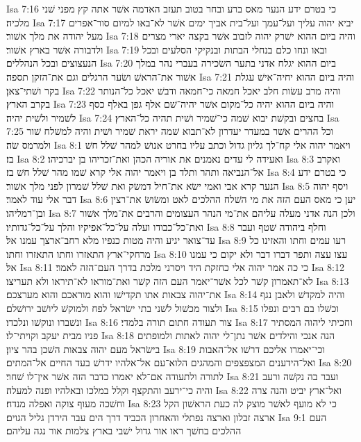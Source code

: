 Isa 7:16  כי בטרם ידע הנער מאס ברע ובחר בטוב תעזב האדמה אשׁר אתה קץ מפני שׁני מלכיה׃
Isa 7:17  יביא יהוה עליך ועל־עמך ועל־בית אביך ימים אשׁר לא־באו למיום סור־אפרים מעל יהודה את מלך אשׁור׃
Isa 7:18  והיה ביום ההוא ישׁרק יהוה לזבוב אשׁר בקצה יארי מצרים ולדבורה אשׁר בארץ אשׁור׃
Isa 7:19  ובאו ונחו כלם בנחלי הבתות ובנקיקי הסלעים ובכל הנעצוצים ובכל הנהללים׃
Isa 7:20  ביום ההוא יגלח אדני בתער השׂכירה בעברי נהר במלך אשׁור את־הראשׁ ושׂער הרגלים וגם את־הזקן תספה׃
Isa 7:21  והיה ביום ההוא יחיה־אישׁ עגלת בקר ושׁתי־צאן׃
Isa 7:22  והיה מרב עשׂות חלב יאכל חמאה כי־חמאה ודבשׁ יאכל כל־הנותר בקרב הארץ׃
Isa 7:23  והיה ביום ההוא יהיה כל־מקום אשׁר יהיה־שׁם אלף גפן באלף כסף לשׁמיר ולשׁית יהיה׃
Isa 7:24  בחצים ובקשׁת יבוא שׁמה כי־שׁמיר ושׁית תהיה כל־הארץ׃
Isa 7:25  וכל ההרים אשׁר במעדר יעדרון לא־תבוא שׁמה יראת שׁמיר ושׁית והיה למשׁלח שׁור ולמרמס שׂה׃
Isa 8:1  ויאמר יהוה אלי קח־לך גליון גדול וכתב עליו בחרט אנושׁ למהר שׁלל חשׁ בז׃
Isa 8:2  ואעידה לי עדים נאמנים את אוריה הכהן ואת־זכריהו בן יברכיהו׃
Isa 8:3  ואקרב אל־הנביאה ותהר ותלד בן ויאמר יהוה אלי קרא שׁמו מהר שׁלל חשׁ בז׃
Isa 8:4  כי בטרם ידע הנער קרא אבי ואמי ישׂא את־חיל דמשׂק ואת שׁלל שׁמרון לפני מלך אשׁור׃
Isa 8:5  ויסף יהוה דבר אלי עוד לאמר׃
Isa 8:6  יען כי מאס העם הזה את מי השׁלח ההלכים לאט ומשׂושׂ את־רצין ובן־רמליהו׃
Isa 8:7  ולכן הנה אדני מעלה עליהם את־מי הנהר העצומים והרבים את־מלך אשׁור ואת־כל־כבודו ועלה על־כל־אפיקיו והלך על־כל־גדותיו׃
Isa 8:8  וחלף ביהודה שׁטף ועבר עד־צואר יגיע והיה מטות כנפיו מלא רחב־ארצך עמנו אל׃
Isa 8:9  רעו עמים וחתו והאזינו כל מרחקי־ארץ התאזרו וחתו התאזרו וחתו׃
Isa 8:10  עצו עצה ותפר דברו דבר ולא יקום כי עמנו אל׃
Isa 8:11  כי כה אמר יהוה אלי כחזקת היד ויסרני מלכת בדרך העם־הזה לאמר׃
Isa 8:12  לא־תאמרון קשׁר לכל אשׁר־יאמר העם הזה קשׁר ואת־מוראו לא־תיראו ולא תעריצו׃
Isa 8:13  את־יהוה צבאות אתו תקדישׁו והוא מוראכם והוא מערצכם׃
Isa 8:14  והיה למקדשׁ ולאבן נגף ולצור מכשׁול לשׁני בתי ישׂראל לפח ולמוקשׁ ליושׁב ירושׁלם׃
Isa 8:15  וכשׁלו בם רבים ונפלו ונשׁברו ונוקשׁו ונלכדו׃
Isa 8:16  צור תעודה חתום תורה בלמדי׃
Isa 8:17  וחכיתי ליהוה המסתיר פניו מבית יעקב וקויתי־לו׃
Isa 8:18  הנה אנכי והילדים אשׁר נתן־לי יהוה לאתות ולמופתים בישׂראל מעם יהוה צבאות השׁכן בהר ציון׃
Isa 8:19  וכי־יאמרו אליכם דרשׁו אל־האבות ואל־הידענים המצפצפים והמהגים הלוא־עם אל־אלהיו ידרשׁ בעד החיים אל־המתים׃
Isa 8:20  לתורה ולתעודה אם־לא יאמרו כדבר הזה אשׁר אין־לו שׁחר׃
Isa 8:21  ועבר בה נקשׁה ורעב והיה כי־ירעב והתקצף וקלל במלכו ובאלהיו ופנה למעלה׃
Isa 8:22  ואל־ארץ יביט והנה צרה וחשׁכה מעוף צוקה ואפלה מנדח׃
Isa 8:23  כי לא מועף לאשׁר מוצק לה כעת הראשׁון הקל ארצה זבלון וארצה נפתלי והאחרון הכביד דרך הים עבר הירדן גליל הגוים׃
Isa 9:1  העם ההלכים בחשׁך ראו אור גדול ישׁבי בארץ צלמות אור נגה עליהם׃
